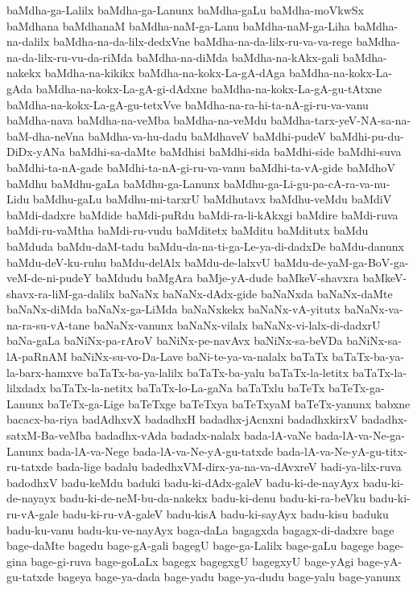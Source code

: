{baMdha-ga-Lalilx
baMdha-ga-Lanunx
baMdha-gaLu
baMdha-moVkwSx
baMdhana
baMdhanaM
baMdha-naM-ga-Lanu
baMdha-naM-ga-Liha
baMdha-na-dalilx
baMdha-na-da-lilx-dedxVne
baMdha-na-da-lilx-ru-va-va-rege
baMdha-na-da-lilx-ru-vu-da-riMda
baMdha-na-diMda
baMdha-na-kAkx-gali
baMdha-nakekx
baMdha-na-kikikx
baMdha-na-kokx-La-gA-dAga
baMdha-na-kokx-La-gAda
baMdha-na-kokx-La-gA-gi-dAdxne
baMdha-na-kokx-La-gA-gu-tAtxne
baMdha-na-kokx-La-gA-gu-tetxVve
baMdha-na-ra-hi-ta-nA-gi-ru-va-vanu
baMdha-nava
baMdha-na-veMba
baMdha-na-veMdu
baMdha-tarx-yeV-NA-sa-na-baM-dha-neVna
baMdha-va-hu-dadu
baMdhaveV
baMdhi-pudeV
baMdhi-pu-du-DiDx-yANa
baMdhi-sa-daMte
baMdhisi
baMdhi-sida
baMdhi-side
baMdhi-suva
baMdhi-ta-nA-gade
baMdhi-ta-nA-gi-ru-va-vanu
baMdhi-ta-vA-gide
baMdhoV
baMdhu
baMdhu-gaLa
baMdhu-ga-Lanunx
baMdhu-ga-Li-gu-pa-cA-ra-va-nu-Lidu
baMdhu-gaLu
baMdhu-mi-tarxrU
baMdhutavx
baMdhu-veMdu
baMdiV
baMdi-dadxre
baMdide
baMdi-puRdu
baMdi-ra-li-kAkxgi
baMdire
baMdi-ruva
baMdi-ru-vaMtha
baMdi-ru-vudu
baMditetx
baMditu
baMditutx
baMdu
baMduda
baMdu-daM-tadu
baMdu-da-na-ti-ga-Le-ya-di-dadxDe
baMdu-danunx
baMdu-deV-ku-ruhu
baMdu-delAlx
baMdu-de-lalxvU
baMdu-de-yaM-ga-BoV-ga-veM-de-ni-pudeY
baMdudu
baMgAra
baMje-yA-dude
baMkeV-shavxra
baMkeV-shavx-ra-liM-ga-dalilx
baNaNx
baNaNx-dAdx-gide
baNaNxda
baNaNx-daMte
baNaNx-diMda
baNaNx-ga-LiMda
baNaNxkekx
baNaNx-vA-yitutx
baNaNx-va-na-ra-su-vA-tane
baNaNx-vanunx
baNaNx-vilalx
baNaNx-vi-lalx-di-dadxrU
baNa-gaLa
baNiNx-pa-rAroV
baNiNx-pe-navAvx
baNiNx-sa-beVDa
baNiNx-sa-lA-paRnAM
baNiNx-su-vo-Da-Lave
baNi-te-ya-va-nalalx
baTaTx
baTaTx-ba-ya-la-barx-hamxve
baTaTx-ba-ya-lalilx
baTaTx-ba-yalu
baTaTx-la-letitx
baTaTx-la-lilxdadx
baTaTx-la-netitx
baTaTx-lo-La-gaNa
baTaTxlu
baTeTx
baTeTx-ga-Lanunx
baTeTx-ga-Lige
baTeTxge
baTeTxya
baTeTxyaM
baTeTx-yanunx
babxne
bacacx-ba-riya
badAdhxvX
badadhxH
badadhx-jAcnxni
badadhxkirxV
badadhx-satxM-Ba-veMba
badadhx-vAda
badadx-nalalx
bada-lA-vaNe
bada-lA-va-Ne-ga-Lanunx
bada-lA-va-Nege
bada-lA-va-Ne-yA-gu-tatxde
bada-lA-va-Ne-yA-gu-titx-ru-tatxde
bada-lige
badalu
badedhxVM-dirx-ya-na-va-dAvxreV
badi-ya-lilx-ruva
badodhxV
badu-keMdu
baduki
badu-ki-dAdx-galeV
badu-ki-de-nayAyx
badu-ki-de-nayayx
badu-ki-de-neM-bu-da-nakekx
badu-ki-denu
badu-ki-ra-beVku
badu-ki-ru-vA-gale
badu-ki-ru-vA-galeV
badu-kisA
badu-ki-sayAyx
badu-kisu
baduku
badu-ku-vanu
badu-ku-ve-nayAyx
baga-daLa
bagagxda
bagagx-di-dadxre
bage
bage-daMte
bagedu
bage-gA-gali
bagegU
bage-ga-Lalilx
bage-gaLu
bagege
bage-gina
bage-gi-ruva
bage-goLaLx
bagegx
bagegxgU
bagegxyU
bage-yAgi
bage-yA-gu-tatxde
bageya
bage-ya-dada
bage-yadu
bage-ya-dudu
bage-yalu
bage-yanunx
}
